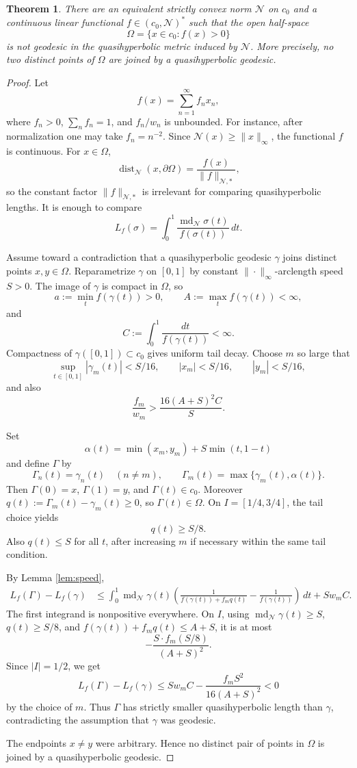 \documentclass[11pt]{article}
\newtheorem{theorem}{Theorem}
\newcommand{\N}{\mathcal N}
\newcommand{\dist}{\operatorname{dist}}
\newcommand{\md}{\operatorname{md}}
\begin{document}
\begin{theorem}\label{thm:main}
There are an equivalent strictly convex norm \(\N\) on \(c_0\) and a continuous linear functional \(f\in (c_0,\N)^*\) such that the open half-space
\[
  \Omega=\{x\in c_0: f(x)>0\}
\]
is not geodesic in the quasihyperbolic metric induced by \(\N\).  More precisely, no two distinct points of \(\Omega\) are joined by a quasihyperbolic geodesic.
\end{theorem}

\begin{proof}
Let
\[
  f(x)=\sum_{n=1}^{\infty}f_nx_n,
\]
where \(f_n>0\), \(\sum_n f_n=1\), and \(f_n/w_n\) is unbounded.  For instance, after normalization one may take \(f_n=n^{-2}\).  Since \(\N(x)\ge \|x\|_\infty\), the functional \(f\) is continuous.  For \(x\in\Omega\),
\[
  \dist_{\N}(x,\partial\Omega)=\frac{f(x)}{\|f\|_{\N,*}},
\]
so the constant factor \(\|f\|_{\N,*}\) is irrelevant for comparing quasihyperbolic lengths.  It is enough to compare
\[
  L_f(\sigma)=\int_0^1\frac{\md_{\N}\sigma(t)}{f(\sigma(t))}\,dt.
\]

Assume toward a contradiction that a quasihyperbolic geodesic \(\gamma\) joins distinct points \(x,y\in\Omega\).  Reparametrize \(\gamma\) on \([0,1]\) by constant \(\|\cdot\|_\infty\)-arclength speed \(S>0\).  The image of \(\gamma\) is compact in \(\Omega\), so
\[
  a:=\min_t f(\gamma(t))>0,\qquad A:=\max_t f(\gamma(t))<\infty,
\]
and
\[
  C:=\int_0^1\frac{dt}{f(\gamma(t))}<\infty.
\]
Compactness of \(\gamma([0,1])\subset c_0\) gives uniform tail decay.  Choose \(m\) so large that
\[
  \sup_{t\in[0,1]}|\gamma_m(t)|<S/16,\qquad |x_m|<S/16,\qquad |y_m|<S/16,
\]
and also
\[
  \frac{f_m}{w_m}>\frac{16(A+S)^2C}{S}.
\]

Set
\[
  \alpha(t)=\min(x_m,y_m)+S\min(t,1-t)
\]
and define \(\Gamma\) by
\[
  \Gamma_n(t)=\gamma_n(t)\quad(n\ne m),\qquad
  \Gamma_m(t)=\max\{\gamma_m(t),\alpha(t)\}.
\]
Then \(\Gamma(0)=x\), \(\Gamma(1)=y\), and \(\Gamma(t)\in c_0\).  Moreover \(q(t):=\Gamma_m(t)-\gamma_m(t)\ge 0\), so \(\Gamma(t)\in\Omega\).  On \(I=[1/4,3/4]\), the tail choice yields
\[
  q(t)\ge S/8.
\]
Also \(q(t)\le S\) for all \(t\), after increasing \(m\) if necessary within the same tail condition.

By Lemma \ref{lem:speed},
\[
\begin{aligned}
L_f(\Gamma)-L_f(\gamma)
&\le
\int_0^1 \md_{\N}\gamma(t)
\left(\frac{1}{f(\gamma(t))+f_mq(t)}-\frac{1}{f(\gamma(t))}\right)\,dt
   +S w_m C .
\end{aligned}
\]
The first integrand is nonpositive everywhere.  On \(I\), using \(\md_{\N}\gamma(t)\ge S\), \(q(t)\ge S/8\), and \(f(\gamma(t))+f_mq(t)\le A+S\), it is at most
\[
  -\frac{S\cdot f_m(S/8)}{(A+S)^2}.
\]
Since \(|I|=1/2\), we get
\[
  L_f(\Gamma)-L_f(\gamma)
  \le S w_m C-\frac{f_mS^2}{16(A+S)^2}<0
\]
by the choice of \(m\).  Thus \(\Gamma\) has strictly smaller quasihyperbolic length than \(\gamma\), contradicting the assumption that \(\gamma\) was geodesic.

The endpoints \(x\ne y\) were arbitrary.  Hence no distinct pair of points in \(\Omega\) is joined by a quasihyperbolic geodesic.
\end{proof}
\end{document}
